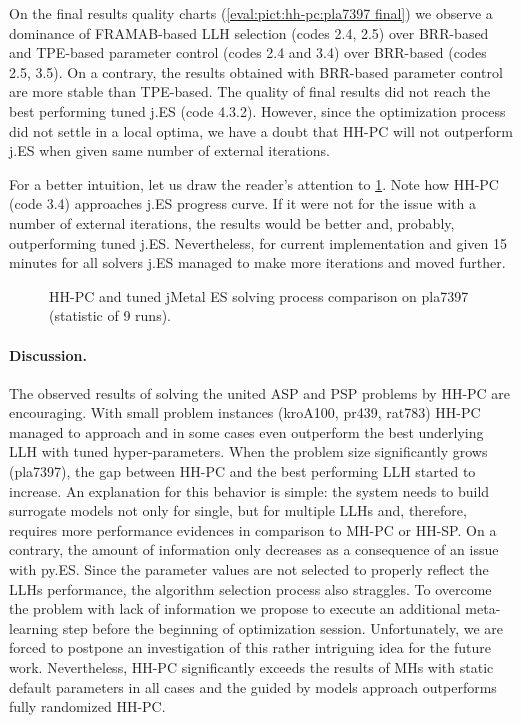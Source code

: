 On the final results quality charts (\cref{eval:pict:hh-pc:pla7397 final}) we observe a dominance of FRAMAB-based LLH selection (codes 2.4, 2.5) over BRR-based and TPE-based parameter control (codes 2.4 and 3.4) over BRR-based (codes 2.5, 3.5). On a contrary, the results obtained with BRR-based parameter control are more stable than TPE-based. The quality of final results did not reach the best performing tuned j.ES (code 4.3.2). However, since the optimization process did not settle in a local optima, we have a doubt that HH-PC will not outperform j.ES when given same number of external iterations.

For a better intuition, let us draw the reader's attention to \cref{eval:pict:hh-pc vs jES on pla7397 process}. Note how HH-PC (code 3.4) approaches j.ES progress curve. If it were not for the issue with a number of external iterations, the results would be better and, probably, outperforming tuned j.ES. Nevertheless, for current implementation and given 15 minutes for all solvers j.ES managed to make more iterations and moved further.

\begin{figure}[h]
	\centering
	\vspace{-5pt}
	
	\caption{HH-PC and tuned jMetal ES solving process comparison on pla7397 (statistic of 9 runs).}
	\vspace{-5pt}
	\label{eval:pict:hh-pc vs jES on pla7397 process}
\end{figure}

\paragraph{Discussion.} The observed results of solving the united ASP and PSP problems by HH-PC are encouraging. With small problem instances (kroA100, pr439, rat783) HH-PC managed to approach and in some cases even outperform the best underlying LLH with tuned hyper-parameters. When the problem size significantly grows (pla7397), the gap between HH-PC and the best performing LLH started to increase. An explanation for this behavior is simple: the system needs to build surrogate models not only for single, but for multiple LLHs and, therefore, requires more performance evidences in comparison to MH-PC or HH-SP. On a contrary, the amount of information only decreases as a consequence of an issue with py.ES. Since the parameter values are not selected to properly reflect the LLHs performance, the algorithm selection process also straggles. To overcome the problem with lack of information we propose to execute an additional meta-learning step before the beginning of optimization session. Unfortunately, we are forced to postpone an investigation of this rather intriguing idea for the future work. Nevertheless, HH-PC significantly exceeds the results of MHs with static default parameters in all cases and the guided by models approach outperforms fully randomized HH-PC.



